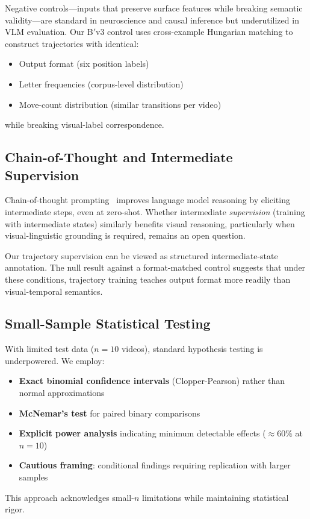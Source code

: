 Negative controls---inputs that preserve surface features while breaking semantic validity---are standard in neuroscience and causal inference but underutilized in VLM evaluation. Our B$'$v3 control uses cross-example Hungarian matching to construct trajectories with identical:
\begin{itemize}
    \item Output format (six position labels)
    \item Letter frequencies (corpus-level distribution)
    \item Move-count distribution (similar transitions per video)
\end{itemize}
while breaking visual-label correspondence.

\subsection{Chain-of-Thought and Intermediate Supervision}

Chain-of-thought prompting~\cite{wei2022chain} improves language model reasoning by eliciting intermediate steps, even at zero-shot. Whether intermediate \emph{supervision} (training with intermediate states) similarly benefits visual reasoning, particularly when visual-linguistic grounding is required, remains an open question.

Our trajectory supervision can be viewed as structured intermediate-state annotation. The null result against a format-matched control suggests that under these conditions, trajectory training teaches output format more readily than visual-temporal semantics.

\subsection{Small-Sample Statistical Testing}

With limited test data ($n=10$ videos), standard hypothesis testing is underpowered. We employ:
\begin{itemize}
    \item \textbf{Exact binomial confidence intervals} (Clopper-Pearson) rather than normal approximations
    \item \textbf{McNemar's test} for paired binary comparisons
    \item \textbf{Explicit power analysis} indicating minimum detectable effects ($\approx 60\%$ at $n=10$)
    \item \textbf{Cautious framing}: conditional findings requiring replication with larger samples
\end{itemize}

This approach acknowledges small-$n$ limitations while maintaining statistical rigor.

